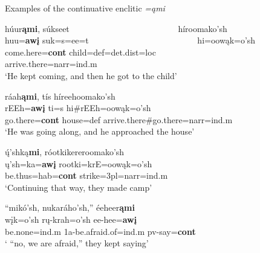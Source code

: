 \begin{exe}

\item\label{continuativeexamples} Examples of the continuative enclitic \textit{=ąmi}

	\begin{xlist}
	
	\item\label{continuativeexamples1}
	
	\glll húur\textbf{ąmi}, súkseet ~ ~ ~ ~ ~ ~ ~ ~ ~ ~ ~ ~ ~ ~ ~ híroomako'sh\\
	huu=\textbf{awį} suk=s=ee=t ~ ~ ~ ~ ~ ~ ~ ~ ~ ~ ~ ~ ~ ~ ~ hi=oowąk=o'sh\\
	\textnormal{come.here}=\textbf{cont} \textnormal{child}=def=det.dist=loc ~ ~ ~ ~ ~ ~ ~ ~ ~ ~ ~ ~ ~ ~ ~ \textnormal{arrive.there}=narr=ind.m\\
	\glt `He kept coming, and then he got to the child' \citep[18]{hollow1973a}
	
	\item\label{continuativeexamples2}
	
	\glll ráah\textbf{ąmi}, tís híreehoomako'sh\\
	rEEh=\textbf{awį} ti=s hi\#rEEh=oowąk=o'sh\\
	\textnormal{go.there}=\textbf{cont} \textnormal{house}=def \textnormal{arrive.there}\#\textnormal{go.there}=narr=ind.m\\
	\glt `He was going along, and he approached the house' \citep[46]{hollow1973b}
	
	\item\label{continuativeexamples3}
	
	\glll ų́'shką\textbf{mi}, róotkikereroomako'sh\\
	ų'sh=ka=\textbf{awį} rootki=krE=oowąk=o'sh\\
	\textnormal{be.thus}=hab=\textbf{cont} \textnormal{strike}=3pl=narr=ind.m\\
	\glt `Continuing that way, they made camp' \citep[49]{hollow1973b}
	
	\item\label{continuativeexamples4}
	
	\glll ``mikó'sh, nukaráho'sh,'' éeheer\textbf{ąmi}\\
	wįk=o'sh rų-krah=o'sh ee-hee=\textbf{awį}\\
	\textnormal{be.none}=ind.m 1a-\textnormal{be.afraid.of}=ind.m pv-\textnormal{say}=\textbf{cont}\\
	\glt ` ``no, we are afraid,'' they kept saying' \citep[22]{hollow1973a}
	

\end{xlist}
\end{exe}

